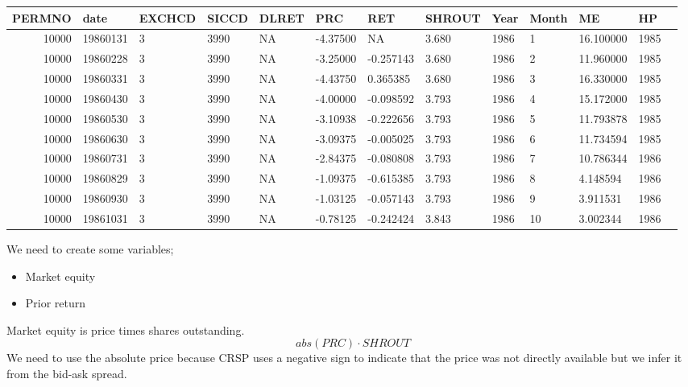 \documentclass[11pt]{article}
\providecommand{\tightlist}{%
      \setlength{\itemsep}{0pt}\setlength{\parskip}{0pt}}
\begin{document}
    \begin{tabular}{r|llllllllllll}
 PERMNO & date & EXCHCD & SICCD & DLRET & PRC & RET & SHROUT & Year & Month & ME & HP\\
\hline
	 10000     & 19860131  & 3         & 3990      & NA        & -4.37500  &        NA & 3.680     & 1986      &  1        & 16.100000 & 1985     \\
	 10000     & 19860228  & 3         & 3990      & NA        & -3.25000  & -0.257143 & 3.680     & 1986      &  2        & 11.960000 & 1985     \\
	 10000     & 19860331  & 3         & 3990      & NA        & -4.43750  &  0.365385 & 3.680     & 1986      &  3        & 16.330000 & 1985     \\
	 10000     & 19860430  & 3         & 3990      & NA        & -4.00000  & -0.098592 & 3.793     & 1986      &  4        & 15.172000 & 1985     \\
	 10000     & 19860530  & 3         & 3990      & NA        & -3.10938  & -0.222656 & 3.793     & 1986      &  5        & 11.793878 & 1985     \\
	 10000     & 19860630  & 3         & 3990      & NA        & -3.09375  & -0.005025 & 3.793     & 1986      &  6        & 11.734594 & 1985     \\
	 10000     & 19860731  & 3         & 3990      & NA        & -2.84375  & -0.080808 & 3.793     & 1986      &  7        & 10.786344 & 1986     \\
	 10000     & 19860829  & 3         & 3990      & NA        & -1.09375  & -0.615385 & 3.793     & 1986      &  8        &  4.148594 & 1986     \\
	 10000     & 19860930  & 3         & 3990      & NA        & -1.03125  & -0.057143 & 3.793     & 1986      &  9        &  3.911531 & 1986     \\
	 10000     & 19861031  & 3         & 3990      & NA        & -0.78125  & -0.242424 & 3.843     & 1986      & 10        &  3.002344 & 1986     \\
\end{tabular}


    
    We need to create some variables;

\begin{itemize}
\tightlist
\item
  Market equity
\item
  Prior return
\end{itemize}

    Market equity is price times shares outstanding.
\[abs(PRC) \cdot SHROUT\] We need to use the absolute price because CRSP
uses a negative sign to indicate that the price was not directly
available but we infer it from the bid-ask spread.
\end{document}
